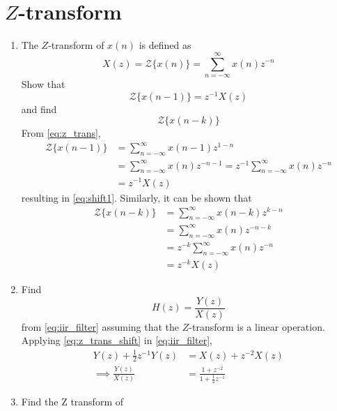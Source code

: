 \documentclass[journal,12pt,twocolumn]{IEEEtran}
\renewcommand\thesection{\arabic{section}}
\begin{document}
\section{$Z$-transform}
\begin{enumerate}[label=\thesection.\arabic*]
\item The $Z$-transform of $x(n)$ is defined as
%
\begin{equation}
\label{eq:z_trans}
X(z)={\mathcal {Z}}\{x(n)\}=\sum _{n=-\infty }^{\infty }x(n)z^{-n}
\end{equation}
%
Show that
\begin{equation}
\label{eq:shift1}
{\mathcal {Z}}\{x(n-1)\} = z^{-1}X(z)
\end{equation}
and find
\begin{equation}
	{\mathcal {Z}}\{x(n-k)\} 
\end{equation}
\solution From \eqref{eq:z_trans},
\begin{align}
{\mathcal {Z}}\{x(n-1)\} &=\sum _{n=-\infty }^{\infty }x(n-1)z^{1-n}
\\
&=\sum _{n=-\infty }^{\infty }x(n)z^{-n-1} = z^{-1}\sum _{n=-\infty }^{\infty }x(n)z^{-n} \\
&= z^{-1}X(z)
\end{align}
resulting in \eqref{eq:shift1}. Similarly, it can be shown that
%
\begin{align}
\label{eq:z_trans_shift}
     {\mathcal {Z}}\{x(n-k)\} &= \sum _{n=-\infty }^{\infty }x(n-k)z^{k-n} \\
     &= \sum _{n=-\infty }^{\infty }x(n)z^{-n-k} \\
     &= z^{-k} \sum _{n=-\infty }^{\infty }x(n)z^{-n} \\         
	&=z^{-k}X(z)
\end{align}
\item Find
%
\begin{equation}
H(z) = \frac{Y(z)}{X(z)}
\end{equation}
%
from  \eqref{eq:iir_filter} assuming that the $Z$-transform is a linear operation.
\\
\solution  Applying \eqref{eq:z_trans_shift} in \eqref{eq:iir_filter},
\begin{align}
Y(z) + \frac{1}{2}z^{-1}Y(z) &= X(z)+z^{-2}X(z)
\\
\implies \frac{Y(z)}{X(z)} &= \frac{1 + z^{-2}}{1 + \frac{1}{2}z^{-1}}
\label{eq:freq_resp}
\end{align}
%
\item Find the Z transform of 
\begin{equation}

\end{equation}
\end{enumerate}
\end{document}

